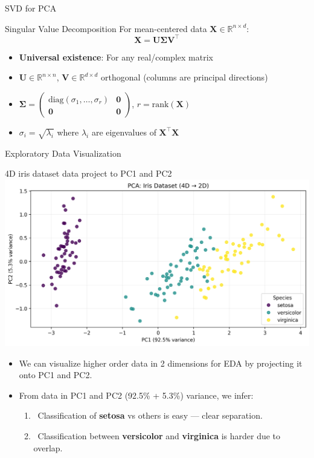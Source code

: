 \documentclass{beamer}
\begin{document}
\begin{frame}{SVD for PCA}
    \begin{block}{Singular Value Decomposition}
        For mean-centered data $\mathbf{X} \in \mathbb{R}^{n \times d}$:
        \[
        \mathbf{X} = \mathbf{U}\mathbf{\Sigma}\mathbf{V}^\top
        \]
        \begin{itemize}
            \item \textbf{Universal existence}: For any real/complex matrix
            \item $\mathbf{U} \in \mathbb{R}^{n \times n}$, $\mathbf{V} \in \mathbb{R}^{d \times d}$ orthogonal (columns are principal directions)
            \item $\mathbf{\Sigma} = \begin{pmatrix}
                \text{diag}(\sigma_1, \ldots, \sigma_r) & \mathbf{0} \\
                \mathbf{0} & \mathbf{0}
            \end{pmatrix}$, $r = \text{rank}(\mathbf{X})$
            \item $\sigma_i = \sqrt{\lambda_i}$ where $\lambda_i$ are eigenvalues of $\mathbf{X}^\top\mathbf{X}$
        \end{itemize}
    \end{block}
\end{frame}




\begin{frame}{Exploratory Data Visualization}
    \begin{center}
        \scriptsize{4D iris dataset data project to PC1 and PC2}
        \includegraphics[width=0.65\linewidth]{images/pca/4D_to_2D.png} \\
    \end{center}

    \begin{itemize}
        \item We can visualize higher order data in 2 dimensions for EDA by projecting it onto PC1 and PC2.
        \item From data in PC1 and PC2 (92.5\% + 5.3\%) variance, we infer:
        \begin{enumerate}
            \item \checkmark \ Classification of \textbf{setosa} vs others is easy — clear separation. 
            \item \checkmark \ Classification between \textbf{versicolor} and \textbf{virginica} is harder due to overlap.
        \end{enumerate}
    \end{itemize}
\end{frame}
\end{document}

